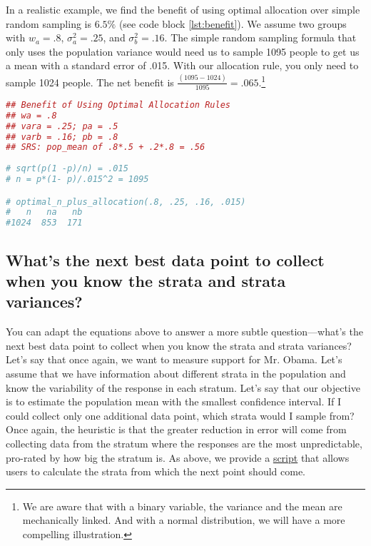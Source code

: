\documentclass[12pt, letterpaper]{article}
\begin{document}
In a realistic example, we find the benefit of using optimal allocation over simple random sampling is $6.5\%$ (see code block \ref{lst:benefit}). We assume two groups with $w_a = .8$, $\sigma_a^2 = .25$, and $\sigma_b^2 = .16$. The simple random sampling formula that only uses the population variance would need us to sample 1095 people to get us a mean with a standard error of .015. With our allocation rule, you only need to sample 1024 people. The net benefit is $\frac{(1095 - 1024)}{1095} = .065$.\footnote{We are aware that with a binary variable, the variance and the mean are mechanically linked. And with a normal distribution, we will have a more compelling illustration.}
\label{code:benefit}
\begin{lstlisting}[caption={Benefit of Using Optimal Sampling},label={lst:benefit},language=R]
## Benefit of Using Optimal Allocation Rules
## wa = .8
## vara = .25; pa = .5
## varb = .16; pb = .8
## SRS: pop_mean of .8*.5 + .2*.8 = .56
   
# sqrt(p(1 -p)/n) = .015
# n = p*(1- p)/.015^2 = 1095

# optimal_n_plus_allocation(.8, .25, .16, .015)
#   n   na   nb 
#1024  853  171 
\end{lstlisting}

\subsection*{What's the next best data point to collect when you know the strata and strata variances?}

You can adapt the equations above to answer a more subtle question---what's the next best data point to collect when you know the strata and strata variances? Let's say that once again, we want to measure support for Mr. Obama. Let's assume that we have information about different strata in the population and know the variability of the response in each stratum. Let's say that our objective is to estimate the population mean with the smallest confidence interval. If I could collect only one additional data point, which strata would I sample from? Once again, the heuristic is that the greater reduction in error will come from collecting data from the stratum where the responses are the most unpredictable, pro-rated by how big the stratum is. As above, we provide a \href{https://github.com/soodoku/optimal\_data\_collection/blob/main/scripts/next\_best\_data\_point.R}{script} that allows users to calculate the strata from which the next point should come.
\end{document}
